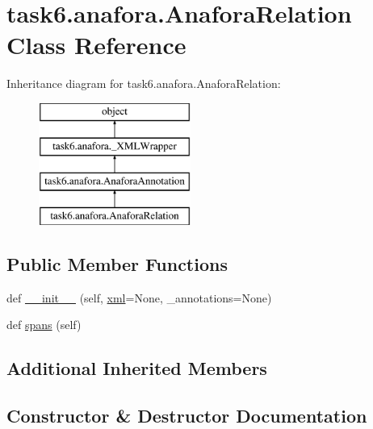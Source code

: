 \hypertarget{classtask6_1_1anafora_1_1AnaforaRelation}{}\section{task6.\+anafora.\+Anafora\+Relation Class Reference}
\label{classtask6_1_1anafora_1_1AnaforaRelation}
Inheritance diagram for task6.\+anafora.\+Anafora\+Relation\+:\begin{figure}[H]
\begin{center}
\leavevmode
\includegraphics[height=4.000000cm]{classtask6_1_1anafora_1_1AnaforaRelation}
\end{center}
\end{figure}
\subsection*{Public Member Functions}
\begin{DoxyCompactItemize}
\item 
def \hyperlink{classtask6_1_1anafora_1_1AnaforaRelation_a69226fd50a66b655d015399ec10aeceb}{\+\_\+\+\_\+init\+\_\+\+\_\+} (self, \hyperlink{classtask6_1_1anafora_1_1__XMLWrapper_abed00085815402c05f9569d349f8dfda}{xml}=None, \+\_\+annotations=None)
\item 
def \hyperlink{classtask6_1_1anafora_1_1AnaforaRelation_adcc1d717d8601ebf6d0f715bc28f4a12}{spans} (self)
\end{DoxyCompactItemize}
\subsection*{Additional Inherited Members}


\subsection{Constructor \& Destructor Documentation}
\mbox{\label{classtask6_1_1anafora_1_1AnaforaRelation_a69226fd50a66b655d015399ec10aeceb}} 
